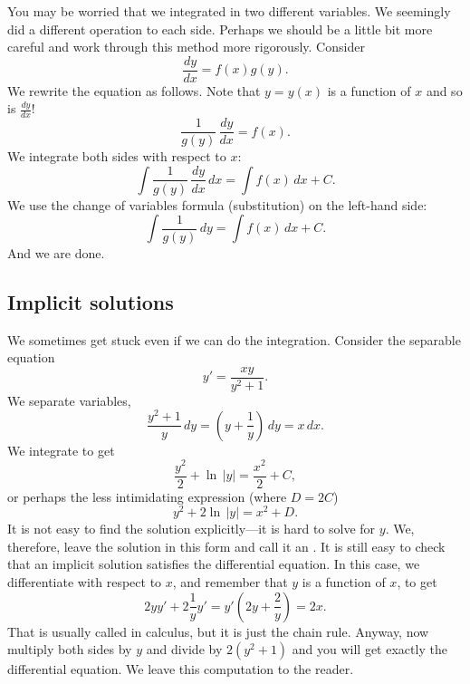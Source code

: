 You may be worried that we
integrated in two different variables.
We seemingly did a different operation to each side.
Perhaps we should be a little bit more careful
and work through this method more rigorously.
Consider
\begin{equation*}
\frac{dy}{dx} = f(x)g(y) .
\end{equation*}
We rewrite the equation as follows.
Note that $y = y(x)$ is a function of $x$ and so is
$\frac{dy}{dx}$!
\begin{equation*}
\frac{1}{g(y)}\,\frac{dy}{dx} = f(x) .
\end{equation*}
We integrate both sides with respect to $x$:
\begin{equation*}
\int \frac{1}{g(y)}\,\frac{dy}{dx} \,dx = \int f(x) \,dx + C .
\end{equation*}
We use the change of variables formula (substitution) on the left-hand side:
\begin{equation*}
\int \frac{1}{g(y)}\,dy = \int f(x) \,dx + C .
\end{equation*}
And we are done.

\subsection{Implicit solutions}

We sometimes get stuck even if we can do the
integration.  Consider the separable equation
\begin{equation*}
y' = \frac{xy}{y^2+1} .
\end{equation*}
We separate variables,
\begin{equation*}
\frac{y^2+1}{y}\,dy = \left(y+\frac{1}{y}\right)\,dy = x\,dx .
\end{equation*}
We integrate to get
\begin{equation*}
\frac{y^2}{2} + \ln \, \lvert y \rvert = \frac{x^2}{2} + C ,
\end{equation*}
or perhaps the less intimidating expression (where $D = 2C$)
\begin{equation*}
y^2 + 2 \ln \, \lvert y\rvert = x^2 + D .
\end{equation*}
It is not easy to find the solution explicitly---it is hard to solve
for $y$.  We, therefore, leave the solution in this form and call
it an
\emph{}.
It is still
easy to check that an implicit solution satisfies the differential
equation.  In this case, we differentiate with respect to $x$, and remember
that $y$ is a function of $x$,
to get
\begin{equation*}
2y y' + 2 \frac{1}{y} y'
=
y'\left(2y + \frac{2}{y}\right) = 2x .
\end{equation*}
That is usually called  in calculus,
but it is just the chain rule.
Anyway, now
multiply both sides by $y$ and divide by $2(y^2+1)$ and you will
get exactly the differential equation.  We leave this computation to the
reader.

